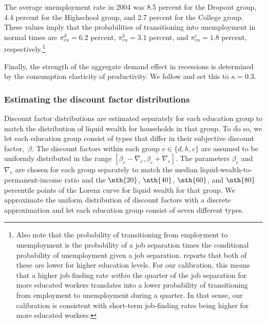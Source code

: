 \documentclass[\econtexRoot/HAFiscal]{subfiles}
\begin{document}
The average unemployment rate in 2004 was 8.5 percent for the Dropout group, 4.4 percent for the Highschool group, and 2.7 percent for the College group.
These values imply that the probabilities of transitioning into unemployment in normal times are $\pi_{eu}^d=6.2$ percent, $\pi_{eu}^h=3.1$ percent, and $\pi_{eu}^c=1.8$ percent, respectively.\footnote{Also note that the probability of transitioning from employment to unemployment is the probability of a job separation times the conditional probability of unemployment given a job separation.
\citet{mincer1991education} reports that both of these are lower for higher education levels.
For our calibration, this means that a higher job finding rate \textit{within} the quarter of the job separation for more educated workers translates	into a lower probability of transitioning from employment to unemployment during a quarter.
In that sense, our calibration is consistent with short-term job-finding rates being higher for more educated workers.}

Finally, the strength of the aggregate demand effect in recessions is determined by the consumption elasticity of productivity.
We follow \cite{kmpHandbook2016} and set this to $\kappa=0.3$.



\hypertarget{estimating-the-discount-factor-distributions}{}\par\subsubsection{Estimating the discount factor distributions} 
\notinsubfile{\label{sec:estimBetas}}

Discount factor distributions are estimated separately for each education group to match the distribution of liquid wealth for households in that group.
To do so, we let each education group consist of types that differ in their subjective discount factor,~$\beta$.
The discount factors within each group $e\in \{d, h, c\}$ are assumed to be uniformly distributed in the range $[\beta_e-\nabla_e, \beta_e+\nabla_e]$.
The parameters $\beta_e$ and $\nabla_e$ are chosen for each group separately to match the median liquid-wealth-to-permanent-income ratio and the $\nth{20}$, $\nth{40}$, $\nth{60}$, and $\nth{80}$ percentile points of the Lorenz curve for liquid wealth for that group.
We approximate the uniform distribution of discount factors with a discrete approximation and let each education group consist of seven different types.
\end{document}
